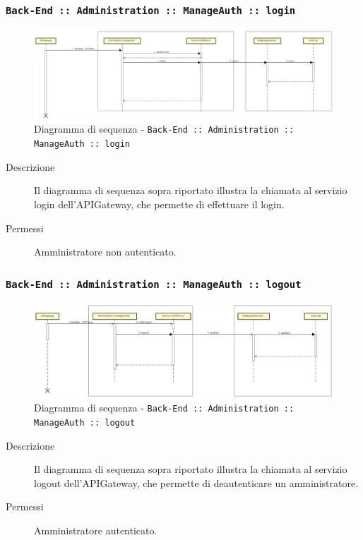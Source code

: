 \documentclass[../DefinizioneDiProdotto_v2.0.0.tex]{subfiles}
\begin{document}
\newpage
\subsubsection{\texttt{Back-End :: Administration :: ManageAuth :: login}}
\begin{figure}[!h]
	\centering
	\includegraphics[scale=0.3]{DiagrammiSequenza/Back-End/manageAuth/login.png}
	\caption{Diagramma di sequenza - \texttt{Back-End :: Administration :: ManageAuth :: login }}
\end{figure}
\begin{description}
	\item [Descrizione] Il diagramma di sequenza sopra riportato illustra la chiamata al servizio login dell'APIGateway, che permette di effettuare il login.
	\item [Permessi] Amministratore non autenticato.
\end{description}

\subsubsection{\texttt{Back-End :: Administration :: ManageAuth :: logout}}
\begin{figure}[!h]
	\centering
	\includegraphics[scale=0.3]{DiagrammiSequenza/Back-End/manageAuth/logout.png}
	\caption{Diagramma di sequenza - \texttt{Back-End :: Administration :: ManageAuth :: logout }}
\end{figure}
\begin{description}
	\item [Descrizione] Il diagramma di sequenza sopra riportato illustra la chiamata al servizio logout dell'APIGateway, che permette di deautenticare un amministratore.
	\item [Permessi] Amministratore autenticato.
\end{description}
\end{document}

